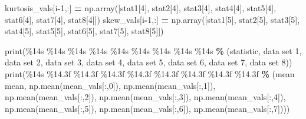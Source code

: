\documentclass[
]{book}
\newenvironment{Shaded}{\begin{snugshade}}{\end{snugshade}}
\newcommand{\BuiltInTok}[1]{#1}
\newcommand{\DecValTok}[1]{\textcolor[rgb]{0.00,0.00,0.81}{#1}}
\newcommand{\NormalTok}[1]{#1}
\newcommand{\OperatorTok}[1]{\textcolor[rgb]{0.81,0.36,0.00}{\textbf{#1}}}
\newcommand{\SpecialCharTok}[1]{\textcolor[rgb]{0.00,0.00,0.00}{#1}}
\newcommand{\StringTok}[1]{\textcolor[rgb]{0.31,0.60,0.02}{#1}}
\begin{document}
\begin{Shaded}
\begin{Highlighting}[]
\NormalTok{    kurtosis\_vals[i}\OperatorTok{{-}}\DecValTok{1}\NormalTok{,:] }\OperatorTok{=}\NormalTok{ np.array([stat1[}\DecValTok{4}\NormalTok{], stat2[}\DecValTok{4}\NormalTok{], stat3[}\DecValTok{4}\NormalTok{], stat4[}\DecValTok{4}\NormalTok{], stat5[}\DecValTok{4}\NormalTok{], stat6[}\DecValTok{4}\NormalTok{], stat7[}\DecValTok{4}\NormalTok{], stat8[}\DecValTok{4}\NormalTok{]])}
\NormalTok{    skew\_vals[i}\OperatorTok{{-}}\DecValTok{1}\NormalTok{,:] }\OperatorTok{=}\NormalTok{ np.array([stat1[}\DecValTok{5}\NormalTok{], stat2[}\DecValTok{5}\NormalTok{], stat3[}\DecValTok{5}\NormalTok{], stat4[}\DecValTok{5}\NormalTok{], stat5[}\DecValTok{5}\NormalTok{], stat6[}\DecValTok{5}\NormalTok{], stat7[}\DecValTok{5}\NormalTok{], stat8[}\DecValTok{5}\NormalTok{]])}

  \BuiltInTok{print}\NormalTok{(}\StringTok{\textquotesingle{}}\SpecialCharTok{\%14s}\StringTok{ }\SpecialCharTok{\%14s}\StringTok{ }\SpecialCharTok{\%14s}\StringTok{ }\SpecialCharTok{\%14s}\StringTok{ }\SpecialCharTok{\%14s}\StringTok{ }\SpecialCharTok{\%14s}\StringTok{ }\SpecialCharTok{\%14s}\StringTok{ }\SpecialCharTok{\%14s}\StringTok{ }\SpecialCharTok{\%14s}\StringTok{\textquotesingle{}} \OperatorTok{\%}\NormalTok{ (}\StringTok{\textquotesingle{}statistic\textquotesingle{}}\NormalTok{, }\StringTok{\textquotesingle{}data set 1\textquotesingle{}}\NormalTok{, }\StringTok{\textquotesingle{}data set 2\textquotesingle{}}\NormalTok{, }\StringTok{\textquotesingle{}data set 3\textquotesingle{}}\NormalTok{, }\StringTok{\textquotesingle{}data set 4\textquotesingle{}}\NormalTok{, }\StringTok{\textquotesingle{}data set 5\textquotesingle{}}\NormalTok{, }\StringTok{\textquotesingle{}data set 6\textquotesingle{}}\NormalTok{, }\StringTok{\textquotesingle{}data set 7\textquotesingle{}}\NormalTok{, }\StringTok{\textquotesingle{}data set 8\textquotesingle{}}\NormalTok{))}
  \BuiltInTok{print}\NormalTok{(}\StringTok{\textquotesingle{}}\SpecialCharTok{\%14s}\StringTok{ }\SpecialCharTok{\%14.3f}\StringTok{ }\SpecialCharTok{\%14.3f}\StringTok{ }\SpecialCharTok{\%14.3f}\StringTok{ }\SpecialCharTok{\%14.3f}\StringTok{ }\SpecialCharTok{\%14.3f}\StringTok{ }\SpecialCharTok{\%14.3f}\StringTok{ }\SpecialCharTok{\%14.3f}\StringTok{ }\SpecialCharTok{\%14.3f}\StringTok{\textquotesingle{}} \OperatorTok{\%}\NormalTok{ (}\StringTok{\textquotesingle{}mean mean\textquotesingle{}}\NormalTok{, np.mean(mean\_vals[:,}\DecValTok{0}\NormalTok{]), np.mean(mean\_vals[:,}\DecValTok{1}\NormalTok{]), np.mean(mean\_vals[:,}\DecValTok{2}\NormalTok{]), np.mean(mean\_vals[:,}\DecValTok{3}\NormalTok{]), np.mean(mean\_vals[:,}\DecValTok{4}\NormalTok{]), np.mean(mean\_vals[:,}\DecValTok{5}\NormalTok{]), np.mean(mean\_vals[:,}\DecValTok{6}\NormalTok{]), np.mean(mean\_vals[:,}\DecValTok{7}\NormalTok{])))}

\end{Highlighting}
\end{Shaded}
\end{document}
